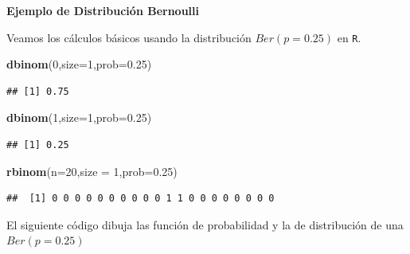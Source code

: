 \documentclass[]{book}
\newenvironment{Shaded}{\begin{snugshade}}{\end{snugshade}}
\newcommand{\DataTypeTok}[1]{\textcolor[rgb]{0.13,0.29,0.53}{#1}}
\newcommand{\DecValTok}[1]{\textcolor[rgb]{0.00,0.00,0.81}{#1}}
\newcommand{\FloatTok}[1]{\textcolor[rgb]{0.00,0.00,0.81}{#1}}
\newcommand{\KeywordTok}[1]{\textcolor[rgb]{0.13,0.29,0.53}{\textbf{#1}}}
\newcommand{\NormalTok}[1]{#1}
\begin{document}
\textbf{Ejemplo de Distribución Bernoulli}

Veamos los cálculos básicos usando la distribución \(Ber(p=0.25)\) en \texttt{R}.

\begin{Shaded}
\begin{Highlighting}[]
\KeywordTok{dbinom}\NormalTok{(}\DecValTok{0}\NormalTok{,}\DataTypeTok{size=}\DecValTok{1}\NormalTok{,}\DataTypeTok{prob=}\FloatTok{0.25}\NormalTok{)}
\end{Highlighting}
\end{Shaded}

\begin{verbatim}
## [1] 0.75
\end{verbatim}

\begin{Shaded}
\begin{Highlighting}[]
\KeywordTok{dbinom}\NormalTok{(}\DecValTok{1}\NormalTok{,}\DataTypeTok{size=}\DecValTok{1}\NormalTok{,}\DataTypeTok{prob=}\FloatTok{0.25}\NormalTok{)}
\end{Highlighting}
\end{Shaded}

\begin{verbatim}
## [1] 0.25
\end{verbatim}

\begin{Shaded}
\begin{Highlighting}[]
\KeywordTok{rbinom}\NormalTok{(}\DataTypeTok{n=}\DecValTok{20}\NormalTok{,}\DataTypeTok{size =} \DecValTok{1}\NormalTok{,}\DataTypeTok{prob=}\FloatTok{0.25}\NormalTok{)}
\end{Highlighting}
\end{Shaded}

\begin{verbatim}
##  [1] 0 0 0 0 0 0 0 0 0 0 1 1 0 0 0 0 0 0 0 0
\end{verbatim}

El siguiente código dibuja las función de probabilidad y la de distribución de una \(Ber(p=0.25)\)
\end{document}
